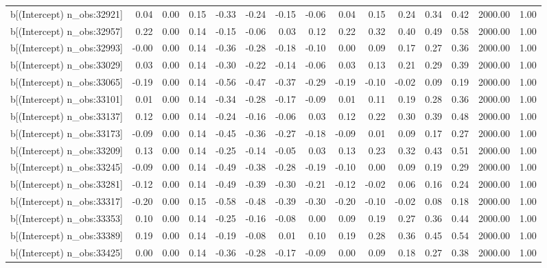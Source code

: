 \begin{table}[ht]
\begin{tabular}{rrrrrrrrrrrrrrr}
  b[(Intercept) n\_obs:32921] & 0.04 & 0.00 & 0.15 & -0.33 & -0.24 & -0.15 & -0.06 & 0.04 & 0.15 & 0.24 & 0.34 & 0.42 & 2000.00 & 1.00 \\ 
  b[(Intercept) n\_obs:32957] & 0.22 & 0.00 & 0.14 & -0.15 & -0.06 & 0.03 & 0.12 & 0.22 & 0.32 & 0.40 & 0.49 & 0.58 & 2000.00 & 1.00 \\ 
  b[(Intercept) n\_obs:32993] & -0.00 & 0.00 & 0.14 & -0.36 & -0.28 & -0.18 & -0.10 & 0.00 & 0.09 & 0.17 & 0.27 & 0.36 & 2000.00 & 1.00 \\ 
  b[(Intercept) n\_obs:33029] & 0.03 & 0.00 & 0.14 & -0.30 & -0.22 & -0.14 & -0.06 & 0.03 & 0.13 & 0.21 & 0.29 & 0.39 & 2000.00 & 1.00 \\ 
  b[(Intercept) n\_obs:33065] & -0.19 & 0.00 & 0.14 & -0.56 & -0.47 & -0.37 & -0.29 & -0.19 & -0.10 & -0.02 & 0.09 & 0.19 & 2000.00 & 1.00 \\ 
  b[(Intercept) n\_obs:33101] & 0.01 & 0.00 & 0.14 & -0.34 & -0.28 & -0.17 & -0.09 & 0.01 & 0.11 & 0.19 & 0.28 & 0.36 & 2000.00 & 1.00 \\ 
  b[(Intercept) n\_obs:33137] & 0.12 & 0.00 & 0.14 & -0.24 & -0.16 & -0.06 & 0.03 & 0.12 & 0.22 & 0.30 & 0.39 & 0.48 & 2000.00 & 1.00 \\ 
  b[(Intercept) n\_obs:33173] & -0.09 & 0.00 & 0.14 & -0.45 & -0.36 & -0.27 & -0.18 & -0.09 & 0.01 & 0.09 & 0.17 & 0.27 & 2000.00 & 1.00 \\ 
  b[(Intercept) n\_obs:33209] & 0.13 & 0.00 & 0.14 & -0.25 & -0.14 & -0.05 & 0.03 & 0.13 & 0.23 & 0.32 & 0.43 & 0.51 & 2000.00 & 1.00 \\ 
  b[(Intercept) n\_obs:33245] & -0.09 & 0.00 & 0.14 & -0.49 & -0.38 & -0.28 & -0.19 & -0.10 & 0.00 & 0.09 & 0.19 & 0.29 & 2000.00 & 1.00 \\ 
  b[(Intercept) n\_obs:33281] & -0.12 & 0.00 & 0.14 & -0.49 & -0.39 & -0.30 & -0.21 & -0.12 & -0.02 & 0.06 & 0.16 & 0.24 & 2000.00 & 1.00 \\ 
  b[(Intercept) n\_obs:33317] & -0.20 & 0.00 & 0.15 & -0.58 & -0.48 & -0.39 & -0.30 & -0.20 & -0.10 & -0.02 & 0.08 & 0.18 & 2000.00 & 1.00 \\ 
  b[(Intercept) n\_obs:33353] & 0.10 & 0.00 & 0.14 & -0.25 & -0.16 & -0.08 & 0.00 & 0.09 & 0.19 & 0.27 & 0.36 & 0.44 & 2000.00 & 1.00 \\ 
  b[(Intercept) n\_obs:33389] & 0.19 & 0.00 & 0.14 & -0.19 & -0.08 & 0.01 & 0.10 & 0.19 & 0.28 & 0.36 & 0.45 & 0.54 & 2000.00 & 1.00 \\ 
  b[(Intercept) n\_obs:33425] & 0.00 & 0.00 & 0.14 & -0.36 & -0.28 & -0.17 & -0.09 & 0.00 & 0.09 & 0.18 & 0.27 & 0.38 & 2000.00 & 1.00 \\ 

\end{tabular}
\end{table}
